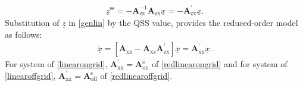 \documentclass[journal]{IEEEtran}
\begin{document}
\begin{align}
    \underline{z}^\mathrm{ss} = -\mathbf{A}_\mathrm{zz}^{-1}\mathbf{A}_\mathrm{zx}\underline{x}= -\mathbf{A}^{'}_\mathrm{zx}\underline{x}.
\end{align}
Substitution of $\underline{z}$ in \eqref{genlin} by the QSS value, provides the reduced-order model as follows:
\begin{align}
    \dot{\underline{x}} = [\mathbf{A}_\mathrm{xx}-\mathbf{A}_\mathrm{xz}\mathbf{A}^{'}_\mathrm{zx}]\underline{x} = \mathbf{A}^{'}_\mathrm{xx}\underline{x}.
\end{align}
For system of \eqref{linearongrid}, $\mathbf{A}^{'}_\mathrm{xx}=\mathbf{A}^\mathrm{s}_\mathrm{on}$ of \eqref{redlinearongrid} and for system of \eqref{linearoffgrid}, $\mathbf{A}^{'}_\mathrm{xx}=\mathbf{A}^\mathrm{s}_\mathrm{off}$ of \eqref{redlinearoffgrid}.
\ifCLASSOPTIONcaptionsoff
  \newpage
\fi
%
%
\end{document}
